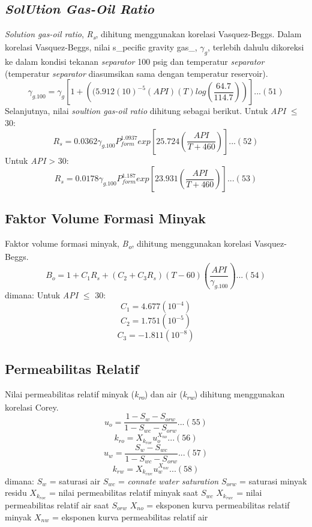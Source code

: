 \documentclass[
]{book}
\begin{document}
\hypertarget{solution-gas-oil-ratio}{%
\subsection{\texorpdfstring{\emph{SolUtion Gas-Oil Ratio}}{SolUtion Gas-Oil Ratio}}\label{solution-gas-oil-ratio}}

\emph{Solution gas-oil ratio}, \emph{R\textsubscript{s}}, dihitung menggunakan korelasi Vasquez-Beggs. Dalam korelasi Vasquez-Beggs, nilai s\_pecific gravity gas\_, \(\gamma_g\), terlebih dahulu dikoreksi ke dalam kondisi tekanan \emph{separator} 100 psig dan temperatur \emph{separator} (temperatur \emph{separator} diasumsikan sama dengan temperatur reservoir).
\[\gamma_{g.100} = \gamma_g \left[ 1+\left( (5.912(10)^{-5}(API)(T)log \left( \frac{64.7}{114.7} \right) \right) \right]...(51)\]
Selanjutnya, nilai \emph{soultion gas-oil ratio} dihitung sebagai berikut.
Untuk \emph{API} \(\leq\) 30:
\[R_s = 0.0362 \gamma_{g.100} P_{form}^{1.0937}exp \left[ 25.724 \left( \frac{API}{T+460} \right)\right]...(52)\]
Untuk \emph{API} \textgreater{} 30:
\[R_s = 0.0178 \gamma_{g.100} P_{form}^{1.187}exp \left[ 23.931 \left( \frac{API}{T+460} \right)\right]...(53)\]

\hypertarget{faktor-volume-formasi-minyak}{%
\subsection{Faktor Volume Formasi Minyak}\label{faktor-volume-formasi-minyak}}

Faktor volume formasi minyak, \emph{B\textsubscript{o}}, dihitung menggunakan korelasi Vasquez-Beggs.
\[B_o = 1 + C_1R_s+(C_2+C_3R_s)(T-60) \left( \frac{API}{\gamma_{g.100}} \right) ...(54)\]
dimana:
Untuk \emph{API} \(\leq\) 30:
\[C_1 =4.677(10^{-4})\]
\[C_2 =1.751(10^{-5})\]
\[C_3 =-1.811(10^{-8})\]

\hypertarget{permeabilitas-relatif}{%
\subsection{Permeabilitas Relatif}\label{permeabilitas-relatif}}

Nilai permeabilitas relatif minyak (\emph{k\textsubscript{ro}}) dan air (\emph{k\textsubscript{rw}}) dihitung menggunakan korelasi Corey.
\[u_o = \frac{1-S_{w}-S_{orw}}{1-S_{wc}-S_{orw}}...(55)\]
\[k_{ro}=X_{k_{roe}}u_o^{X_{no}}...(56)\]
\[u_w = \frac{S_{w}-S_{wc}}{1-S_{wc}-S_{orw}}...(57)\]
\[k_{rw}=X_{k_{rwe}}u_w^{X_{nw}}...(58)\]
dimana:
\(S_w\) = saturasi air
\(S_{wc}\) = \emph{connate water saturation}
\(S_{orw}\) = saturasi minyak residu
\(X_{k_{roe}}\) = nilai permeabilitas relatif minyak saat \(S_{wc}\)
\(X_{k_{rwe}}\) = nilai permeabilitas relatif air saat \(S_{orw}\)
\(X_{no}\) = eksponen kurva permeabilitas relatif minyak
\(X_{nw}\) = eksponen kurva permeabilitas relatif air
\end{document}
